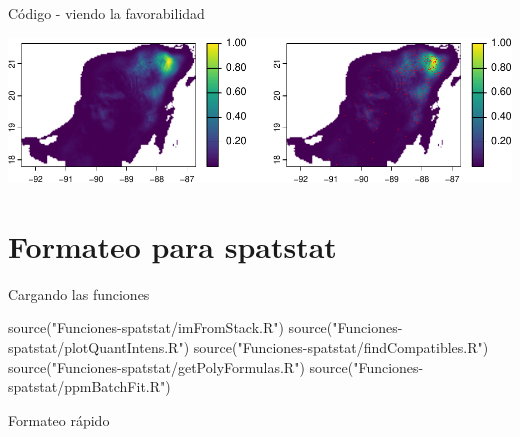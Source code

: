 \documentclass[
  11pt,
  ignorenonframetext,
]{beamer}
\newenvironment{Shaded}{}{}
\newcommand{\AttributeTok}[1]{\textcolor[rgb]{0.49,0.56,0.16}{#1}}
\newcommand{\DecValTok}[1]{\textcolor[rgb]{0.25,0.63,0.44}{#1}}
\newcommand{\FunctionTok}[1]{\textcolor[rgb]{0.02,0.16,0.49}{#1}}
\newcommand{\NormalTok}[1]{#1}
\newcommand{\OtherTok}[1]{\textcolor[rgb]{0.00,0.44,0.13}{#1}}
\newcommand{\SpecialCharTok}[1]{\textcolor[rgb]{0.25,0.44,0.63}{#1}}
\newcommand{\StringTok}[1]{\textcolor[rgb]{0.25,0.44,0.63}{#1}}
\begin{document}
\begin{frame}{Código - viendo la favorabilidad}
\protect\hypertarget{cuxf3digo---viendo-la-favorabilidad}{}
\begin{center}\includegraphics{Tutorial-spatstat-2_files/figure-beamer/unnamed-chunk-3-1} \end{center}
\end{frame}

\hypertarget{formateo-para-spatstat}{%
\section{Formateo para spatstat}\label{formateo-para-spatstat}}

\begin{frame}[fragile]{Cargando las funciones}
\protect\hypertarget{cargando-las-funciones}{}
\begin{Shaded}
\begin{Highlighting}[]
\FunctionTok{source}\NormalTok{(}\StringTok{"Funciones{-}spatstat/imFromStack.R"}\NormalTok{)}
\FunctionTok{source}\NormalTok{(}\StringTok{"Funciones{-}spatstat/plotQuantIntens.R"}\NormalTok{)}
\FunctionTok{source}\NormalTok{(}\StringTok{"Funciones{-}spatstat/findCompatibles.R"}\NormalTok{)}
\FunctionTok{source}\NormalTok{(}\StringTok{"Funciones{-}spatstat/getPolyFormulas.R"}\NormalTok{)}
\FunctionTok{source}\NormalTok{(}\StringTok{"Funciones{-}spatstat/ppmBatchFit.R"}\NormalTok{)}
\end{Highlighting}
\end{Shaded}
\end{frame}

\begin{frame}[fragile]{Formateo rápido}
\protect\hypertarget{formateo-ruxe1pido}{}
\begin{Shaded}
\end{Shaded}
\end{frame}
\end{document}
